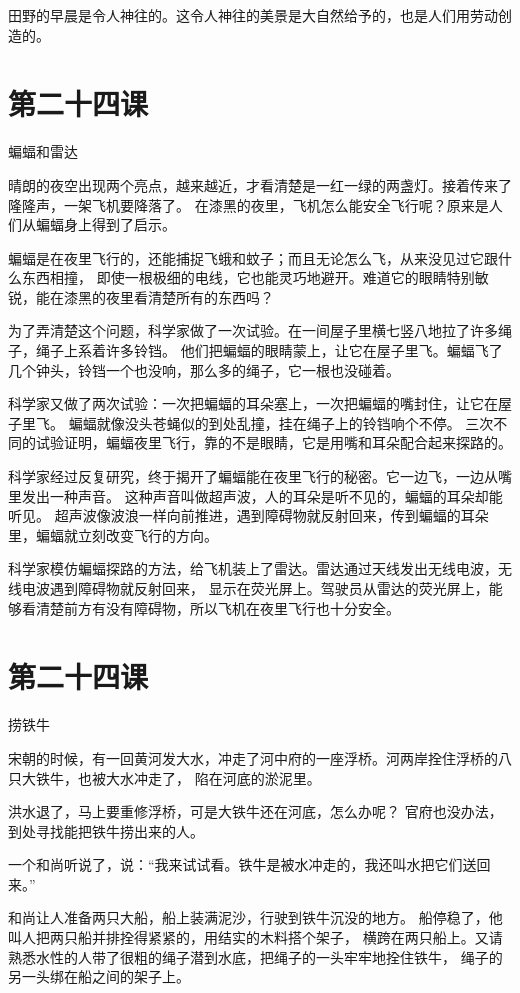\documentclass[12pt,UTF8]{ctexbook}
\begin{document}
田野的早晨是令人神往的。这令人神往的美景是大自然给予的，也是人们用劳动创造的。

\section{第二十四课}

蝙蝠和雷达

晴朗的夜空出现两个亮点，越来越近，才看清楚是一红一绿的两盏灯。接着传来了隆隆声，一架飞机要降落了。
在漆黑的夜里，飞机怎么能安全飞行呢？原来是人们从蝙蝠身上得到了启示。

蝙蝠是在夜里飞行的，还能捕捉飞蛾和蚊子；而且无论怎么飞，从来没见过它跟什么东西相撞，
即使一根极细的电线，它也能灵巧地避开。难道它的眼睛特别敏锐，能在漆黑的夜里看清楚所有的东西吗？

为了弄清楚这个问题，科学家做了一次试验。在一间屋子里横七竖八地拉了许多绳子，绳子上系着许多铃铛。
他们把蝙蝠的眼睛蒙上，让它在屋子里飞。蝙蝠飞了几个钟头，铃铛一个也没响，那么多的绳子，它一根也没碰着。

科学家又做了两次试验：一次把蝙蝠的耳朵塞上，一次把蝙蝠的嘴封住，让它在屋子里飞。
蝙蝠就像没头苍蝇似的到处乱撞，挂在绳子上的铃铛响个不停。
三次不同的试验证明，蝙蝠夜里飞行，靠的不是眼睛，它是用嘴和耳朵配合起来探路的。

科学家经过反复研究，终于揭开了蝙蝠能在夜里飞行的秘密。它一边飞，一边从嘴里发出一种声音。
这种声音叫做超声波，人的耳朵是听不见的，蝙蝠的耳朵却能听见。
超声波像波浪一样向前推进，遇到障碍物就反射回来，传到蝙蝠的耳朵里，蝙蝠就立刻改变飞行的方向。

科学家模仿蝙蝠探路的方法，给飞机装上了雷达。雷达通过天线发出无线电波，无线电波遇到障碍物就反射回来，
显示在荧光屏上。驾驶员从雷达的荧光屏上，能够看清楚前方有没有障碍物，所以飞机在夜里飞行也十分安全。

\section{第二十四课}

捞铁牛

宋朝的时候，有一回黄河发大水，冲走了河中府的一座浮桥。河两岸拴住浮桥的八只大铁牛，也被大水冲走了，
陷在河底的淤泥里。

洪水退了，马上要重修浮桥，可是大铁牛还在河底，怎么办呢？
官府也没办法，到处寻找能把铁牛捞出来的人。

一个和尚听说了，说：“我来试试看。铁牛是被水冲走的，我还叫水把它们送回来。”

和尚让人准备两只大船，船上装满泥沙，行驶到铁牛沉没的地方。
船停稳了，他叫人把两只船并排拴得紧紧的，用结实的木料搭个架子，
横跨在两只船上。又请熟悉水性的人带了很粗的绳子潜到水底，把绳子的一头牢牢地拴住铁牛，
绳子的另一头绑在船之间的架子上。
\end{document}
